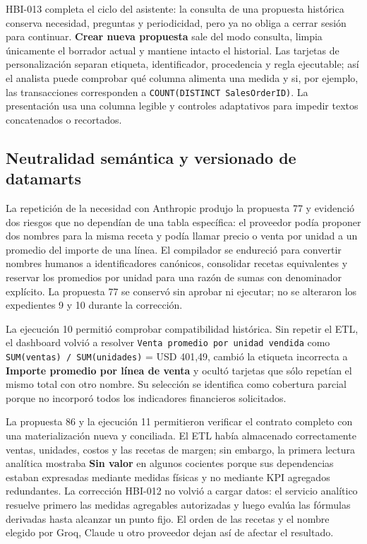 \documentclass[11pt,letterpaper]{article}
\newcommand{\file}[1]{\texttt{#1}}
\begin{document}
HBI-013 completa el ciclo del asistente: la consulta de una propuesta histórica conserva necesidad, preguntas y periodicidad, pero ya no obliga a cerrar sesión para continuar. \textbf{Crear nueva propuesta} sale del modo consulta, limpia únicamente el borrador actual y mantiene intacto el historial. Las tarjetas de personalización separan etiqueta, identificador, procedencia y regla ejecutable; así el analista puede comprobar qué columna alimenta una medida y si, por ejemplo, las transacciones corresponden a \file{COUNT(DISTINCT SalesOrderID)}. La presentación usa una columna legible y controles adaptativos para impedir textos concatenados o recortados.

\subsection{Neutralidad semántica y versionado de datamarts}

La repetición de la necesidad con Anthropic produjo la propuesta 77 y evidenció dos riesgos que no dependían de una tabla específica: el proveedor podía proponer dos nombres para la misma receta y podía llamar precio o venta por unidad a un promedio del importe de una línea. El compilador se endureció para convertir nombres humanos a identificadores canónicos, consolidar recetas equivalentes y reservar los promedios por unidad para una razón de sumas con denominador explícito. La propuesta 77 se conservó sin aprobar ni ejecutar; no se alteraron los expedientes 9 y 10 durante la corrección.

La ejecución 10 permitió comprobar compatibilidad histórica. Sin repetir el ETL, el dashboard volvió a resolver \file{Venta promedio por unidad vendida} como \file{SUM(ventas) / SUM(unidades)} = USD 401,49, cambió la etiqueta incorrecta a \textbf{Importe promedio por línea de venta} y ocultó tarjetas que sólo repetían el mismo total con otro nombre. Su selección se identifica como cobertura parcial porque no incorporó todos los indicadores financieros solicitados.

La propuesta 86 y la ejecución 11 permitieron verificar el contrato completo con una materialización nueva y conciliada. El ETL había almacenado correctamente ventas, unidades, costos y las recetas de margen; sin embargo, la primera lectura analítica mostraba \textbf{Sin valor} en algunos cocientes porque sus dependencias estaban expresadas mediante medidas físicas y no mediante KPI agregados redundantes. La corrección HBI-012 no volvió a cargar datos: el servicio analítico resuelve primero las medidas agregables autorizadas y luego evalúa las fórmulas derivadas hasta alcanzar un punto fijo. El orden de las recetas y el nombre elegido por Groq, Claude u otro proveedor dejan así de afectar el resultado.
\end{document}
